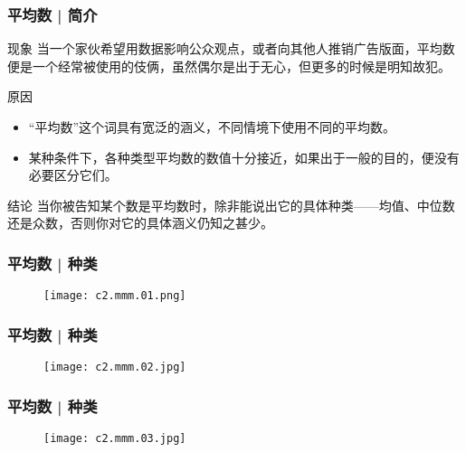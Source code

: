 \begin{frame}
  \frametitle{平均数 | 简介}
  \begin{block}{现象}
    当一个家伙希望用数据影响公众观点，或者向其他人推销广告版面，平均数便是一个经常被使用的伎俩，虽然偶尔是出于无心，但更多的时候是明知故犯。
  \end{block}
  \pause
  \begin{block}{原因}
    \begin{itemize}
      \item “平均数”这个词具有宽泛的涵义，不同情境下使用不同的平均数。
      \item 某种条件下，各种类型平均数的数值十分接近，如果出于一般的目的，便没有必要区分它们。
    \end{itemize}
  \end{block}
  \pause
  \begin{block}{结论}
    当你被告知某个数是平均数时，除非能说出它的具体种类——均值、中位数还是众数，否则你对它的具体涵义仍知之甚少。
  \end{block}
\end{frame}

\begin{frame}
  \frametitle{平均数 | 种类}
  \begin{figure}
    \centering
    \texttt{[image: c2.mmm.01.png]}
  \end{figure}
\end{frame}

\begin{frame}
  \frametitle{平均数 | 种类}
  \begin{figure}
    \centering
    \texttt{[image: c2.mmm.02.jpg]}
  \end{figure}
\end{frame}

\begin{frame}
  \frametitle{平均数 | 种类}
  \begin{figure}
    \centering
    \texttt{[image: c2.mmm.03.jpg]}
  \end{figure}
\end{frame}

